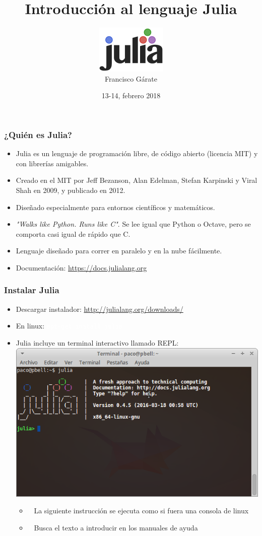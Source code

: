 \documentclass{beamer}
\title{Introducción al lenguaje Julia}
\author{\includegraphics[scale=0.5]{images/128px-Julia_prog_language}\\Francisco Gárate}
\institute{Jornadas Medialab-Prado}
\date{13-14, febrero 2018}
\providecommand{\comando}[1]{\texttt{\colorbox{morado_w}{\textcolor{white}{#1}}}}
\begin{document}
\frame{\titlepage}
 
\begin{frame}
\frametitle{¿Quién es Julia?}
\begin{itemize}
	\item Julia es un lenguaje de programación libre, de código abierto (licencia MIT) y con librerías amigables.
	\item Creado en el MIT por Jeff Bezanson, Alan Edelman, Stefan Karpinski y Viral Shah en 2009, y publicado en 2012.
	\item Diseñado especialmente para entornos científicos y matemáticos. 
	\item \textit{"Walks like Python. Runs like C"}. Se lee igual que Python o Octave, pero se comporta casi igual de rápido que C.
	\item Lenguaje diseñado para correr en paralelo y en la nube fácilmente.
	\item Documentación: \url{https://docs.julialang.org}
\end{itemize}
\end{frame}

\begin{frame}
\frametitle{Instalar Julia}
\begin{itemize}
	\item Descargar instalador: \url{http://julialang.org/downloads/}
	\item En linux: \comando{apt-get install julia}
	\item Julia incluye un terminal interactivo llamado REPL:\\
	\includegraphics[scale=0.35]{images/julia-consola}
		\begin{itemize}
		\item \comando{;} La siguiente instrucción se ejecuta como si fuera una consola de linux
		\item \comando{?} Busca el texto a introducir en los manuales de ayuda
		\end{itemize}
\end{itemize}
\end{frame}
\end{document}

